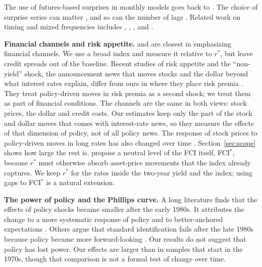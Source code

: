 \documentclass[11pt]{article}
\newcommand{\rs}{r^{*}}
\begin{document}
The use of futures-based surprises in monthly models goes back to \citet{faust2004}. The choice of surprise series can matter \citep{bu2021,brennan2025}, and so can the number of lags \citep{coibion2012}. Related work on timing and mixed frequencies includes \citet{kilian2024}, \citet{chudik2022}, \citet{francis2011}, \citet{ghysels2016} and \citet{gazzani2020}.

\textbf{Financial channels and risk appetite.} \citet{gertler2015} and \citet{caldara2019} are closest in emphasizing financial channels. We use a broad index and measure it relative to $\rs$, but leave credit spreads out of the baseline. Recent studies of risk appetite and the ``non-yield'' shock, the announcement news that moves stocks and the dollar beyond what interest rates explain, differ from ours in where they place risk premia \citep{bauer2026,boehm2024,boehm2026}. They treat policy-driven moves in risk premia as a second shock; we treat them as part of financial conditions. The channels are the same in both views: stock prices, the dollar and credit costs. Our estimates keep only the part of the stock and dollar moves that comes with interest-rate news, so they measure the effects of that dimension of policy, not of all policy news. The response of stock prices to policy-driven moves in long rates has also changed over time \citep{kiley2014}. Section~\ref{sec:scope} shows how large the rest is. \citet{caballero2026} propose a neutral level of the FCI itself, FCI$^*$, because $\rs$ must otherwise absorb asset-price movements that the index already captures. We keep $\rs$ for the rates inside the two-year yield and the index; using gaps to FCI$^*$ is a natural extension.

\textbf{The power of policy and the Phillips curve.} A long literature finds that the effects of policy shocks became smaller after the early 1980s. It attributes the change to a more systematic response of policy and to better-anchored expectations \citep{boivin2006,boivin2010,primiceri2005}. Others argue that standard identification fails after the late 1980s because policy became more forward-looking \citep{barakchian2013}. Our results do not suggest that policy has lost power. Our effects are larger than in samples that start in the 1970s, though that comparison is not a formal test of change over time.
\end{document}
